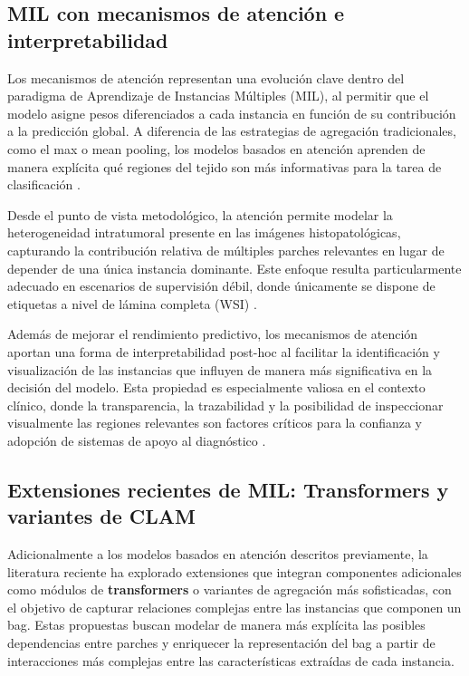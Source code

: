\subsection{MIL con mecanismos de atención e interpretabilidad}
Los mecanismos de atención representan una evolución clave dentro del paradigma de Aprendizaje de Instancias Múltiples (MIL), al permitir que el modelo asigne pesos diferenciados a cada instancia en función de su contribución a la predicción global. A diferencia de las estrategias de agregación tradicionales, como el max o mean pooling, los modelos basados en atención aprenden de manera explícita qué regiones del tejido son más informativas para la tarea de clasificación \cite{campanella2019clinical} \cite{ilse2018attention} .\newline

Desde el punto de vista metodológico, la atención permite modelar la heterogeneidad intratumoral presente en las imágenes histopatológicas, capturando la contribución relativa de múltiples parches relevantes en lugar de depender de una única instancia dominante. Este enfoque resulta particularmente adecuado en escenarios de supervisión débil, donde únicamente se dispone de etiquetas a nivel de lámina completa (WSI) \cite{lu2021data}.\newline

Además de mejorar el rendimiento predictivo, los mecanismos de atención aportan una forma de interpretabilidad post-hoc al facilitar la identificación y visualización de las instancias que influyen de manera más significativa en la decisión del modelo. Esta propiedad es especialmente valiosa en el contexto clínico, donde la transparencia, la trazabilidad y la posibilidad de inspeccionar visualmente las regiones relevantes son factores críticos para la confianza y adopción de sistemas de apoyo al diagnóstico \cite{campanella2019clinical} \cite{rudin2019stop}.

\subsection{Extensiones recientes de MIL: Transformers y variantes de CLAM}
Adicionalmente a los modelos basados en atención descritos previamente, la literatura reciente ha explorado extensiones que integran componentes adicionales como módulos de \textbf{transformers} o variantes de agregación más sofisticadas, con el objetivo de capturar relaciones complejas entre las instancias que componen un bag. Estas propuestas buscan modelar de manera más explícita las posibles dependencias entre parches y enriquecer la representación del bag a partir de interacciones más complejas entre las características extraídas de cada instancia.\newline

